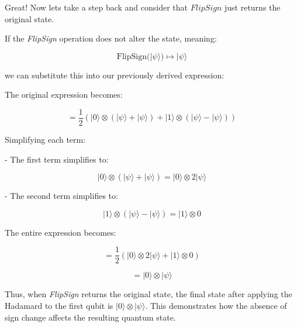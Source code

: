 \begin{ai}
Great! Now lets take a step back and consider that $FlipSign$ just returns the original state.
\end{ai}

\begin{airesult}
If the \textit{FlipSign} operation does not alter the state, meaning:

\[
\text{FlipSign}(|\psi\rangle) \mapsto |\psi\rangle
\]

we can substitute this into our previously derived expression:

\vsp

The original expression becomes:

\[
= \dfrac{1}{2} \left( |0\rangle \otimes (|\psi\rangle + |\psi\rangle)
+ |1\rangle \otimes (|\psi\rangle - |\psi\rangle) \right)
\]

Simplifying each term:

- The first term simplifies to:

\[
|0\rangle \otimes (|\psi\rangle + |\psi\rangle) = |0\rangle \otimes 2|\psi\rangle
\]

- The second term simplifies to:

\[
|1\rangle \otimes (|\psi\rangle - |\psi\rangle) = |1\rangle \otimes 0
\]

The entire expression becomes:

\[
= \dfrac{1}{2} \left( |0\rangle \otimes 2|\psi\rangle + |1\rangle \otimes 0 \right)
\]

\[
= |0\rangle \otimes |\psi\rangle
\]

\vsp

Thus, when \textit{FlipSign} returns the original state, the final state after applying the Hadamard
to the first qubit is \(|0\rangle \otimes |\psi\rangle\). This demonstrates how the absence of sign
change affects the resulting quantum state.
\end{airesult}


